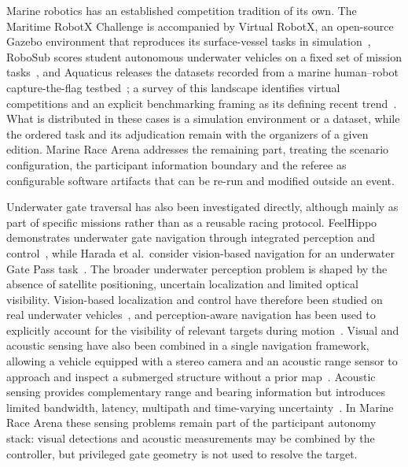 Marine robotics has an established competition tradition of its own. The
Maritime RobotX Challenge is accompanied by Virtual RobotX, an open-source
Gazebo environment that reproduces its surface-vessel tasks in
simulation~\cite{bingham2019vrx}, RoboSub scores student autonomous underwater
vehicles on a fixed set of mission tasks~\cite{robonation2026robosub}, and
Aquaticus releases the datasets recorded from a marine human--robot
capture-the-flag testbed~\cite{novitzky2019aquaticus}; a survey of this
landscape identifies virtual competitions and an explicit benchmarking framing
as its defining recent trend~\cite{ferreira2020marinecompetitions}. What is
distributed in these cases is a simulation environment or a dataset, while the
ordered task and its adjudication remain with the organizers of a given
edition. Marine Race Arena addresses the remaining part, treating the scenario
configuration, the participant information boundary and the referee as
configurable software artifacts that can be re-run and modified outside an
event.

Underwater gate traversal has also been investigated directly, although mainly
as part of specific missions rather than as a reusable racing protocol.
FeelHippo demonstrates underwater gate navigation through integrated perception
and control~\cite{franchi2020feelhippo}, while Harada et al.\ consider
vision-based navigation for an underwater Gate Pass
task~\cite{harada2022gatepass}. The broader underwater perception problem is
shaped by the absence of satellite positioning, uncertain localization and
limited optical visibility. Vision-based localization and control have therefore
been studied on real underwater vehicles~\cite{manzanilla2019uuvnavigation}, and
perception-aware navigation has been used to explicitly account for the
visibility of relevant targets during motion~\cite{xanthidis2021aquavis}. Visual
and acoustic sensing have also been combined in a single navigation framework,
allowing a vehicle equipped with a stereo camera and an acoustic range sensor to
approach and inspect a submerged structure without a prior
map~\cite{tani2026visualacoustic}. Acoustic sensing provides complementary range
and bearing information but introduces limited bandwidth, latency, multipath and
time-varying uncertainty~\cite{stojanovic2009underwater}. In Marine Race Arena
these sensing problems remain part of the participant autonomy stack: visual
detections and acoustic measurements may be combined by the controller, but
privileged gate geometry is not used to resolve the target.

